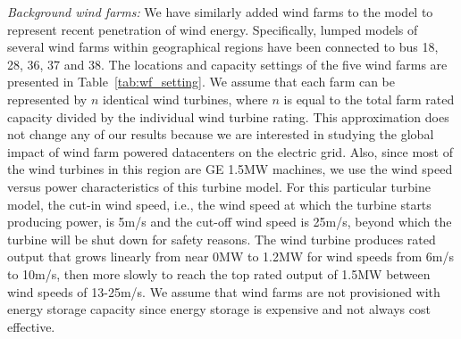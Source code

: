 {\em Background wind farms:} We have similarly added wind farms to the
model to represent recent penetration of wind energy.  Specifically,
lumped models of several wind farms within geographical regions have
been connected to bus 18, 28, 36, 37 and 38.  The locations and
capacity settings of the five wind farms are presented in
Table~\ref{tab:wf_setting}. We assume that each farm can be
represented by $n$ identical wind turbines, where $n$ is equal to the
total farm rated capacity divided by the individual wind turbine
rating. This approximation does not change any of our results because
we are interested in studying the global impact of wind farm powered
datacenters on the electric grid. Also, since most of the wind
turbines in this region are GE 1.5MW machines, we use the wind speed
versus power characteristics of this turbine
model\cite{lei2006modeling}.  For this particular turbine model, the
cut-in wind speed, i.e., the wind speed at which the turbine starts
producing power, is 5m/s and the cut-off wind speed is 25m/s, beyond
which the turbine will be shut down for safety reasons. The wind
turbine produces rated output that grows linearly from near 0MW to
1.2MW for wind speeds from 6m/s to 10m/s, then more slowly to reach
the top rated output of 1.5MW between wind speeds of 13-25m/s.  We
assume that wind farms are not provisioned with energy storage
capacity since energy storage is expensive and not always cost
effective.




